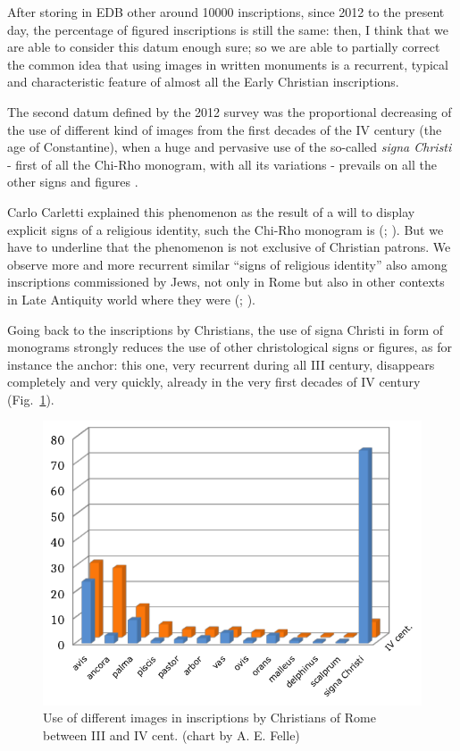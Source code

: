 \documentclass[amsthm,ebook]{saparticle}
\begin{document}
After storing in EDB other around 10000 inscriptions, since 2012 to the present day, the percentage of figured inscriptions is
still the same: then, I think that we are able to consider this datum enough sure; so we are able to partially correct
the common idea that using images in written monuments is a recurrent, typical and characteristic feature of almost all
the Early Christian inscriptions.

The second datum defined by the 2012 survey was the proportional decreasing of the use of different kind of images from
the first decades of the IV century (the age of Constantine), when a huge and pervasive use of the so-called \emph{signa
Christi} - first of all the Chi-Rho monogram, with all its variations - prevails on all the other signs and figures
\citep[101-102]{felle_apporto_2013}.

Carlo Carletti explained this phenomenon as the result of a will to display explicit signs of a religious identity, such
the Chi-Rho monogram is (\citealp[68-72]{carletti_epigrafia_2008}; \citealp[365-366]{felle_judaism_2007}). But we have to underline that the phenomenon is
not exclusive of Christian patrons. We observe more and more recurrent similar ``signs of religious identity'' also among inscriptions commissioned by Jews, not only in Rome but also in other contexts in
Late Antiquity world where they were (\citealp[passim]{felle_judaism_2007}; \citealp{pesce_documenti_2016}).

Going back to the inscriptions by Christians, the use of signa Christi in form of monograms strongly reduces the use
of other christological signs or figures, as for instance the anchor: this one, very recurrent during all III
century, disappears completely and very quickly, already in the very first decades of IV century \citep[103]{felle_apporto_2013}
(Fig.~\ref{fig:2}). %




\begin{figure}[!htbp]
\centering
 \includegraphics[width=\columnwidth]{FelleVisualFeaturesofinscriptionsEAGLE2016FullPaper-img001.pdf}
\caption{Use of different images in inscriptions by Christians of Rome between III and IV cent. (chart by A. E. Felle)}
\label{fig:2}
\end{figure}
 
\end{document}
